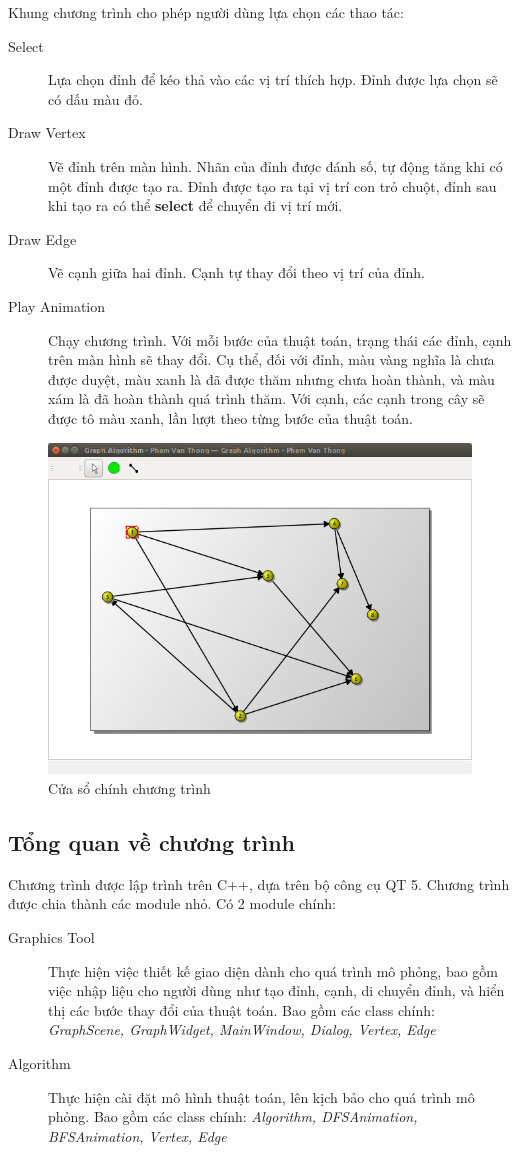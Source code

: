 \documentclass[a4paper,10pt]{article}
\begin{document}
Khung chương trình cho phép người dùng lựa chọn các thao tác:
\begin{description}
\item[Select] Lựa chọn đỉnh để kéo thả vào các vị trí thích hợp. Đỉnh được lựa chọn sẽ có dấu màu đỏ.
\item[Draw Vertex] Vẽ đỉnh trên màn hình. Nhãn của đỉnh được đánh số, tự động tăng khi có một đỉnh được tạo ra. Đỉnh được tạo ra tại vị trí con trỏ chuột, đỉnh sau khi tạo ra có thể \textbf{select} để chuyển đi vị trí mới.
\item[Draw Edge] Vẽ cạnh giữa hai đỉnh. Cạnh tự thay đổi theo vị trí của đỉnh.
\item[Play Animation] Chạy chương trình. Với mỗi bước của thuật toán, trạng thái các đỉnh, cạnh trên màn hình sẽ thay đổi. Cụ thể, đối với đỉnh, màu vàng nghĩa là chưa được duyệt, màu xanh là đã được thăm nhưng chưa hoàn thành, và màu xám là đã hoàn thành quá trình thăm. Với cạnh, các cạnh trong cây sẽ được tô màu xanh, lần lượt theo từng bước của thuật toán.
\end{description}
\begin{figure}[h!]
  \centering
  \includegraphics[scale=0.5]{images/pic5.png}
  \caption{Cửa sổ chính chương trình }
\end{figure}

\subsection{Tổng quan về chương trình}
Chương trình được lập trình trên C++, dựa trên bộ công cụ QT 5. Chương trình được chia thành các module nhỏ. Có 2 module chính:
\begin{description}
\item[Graphics Tool ] Thực hiện việc thiết kế giao diện dành cho quá trình mô phỏng, bao gồm việc nhập liệu cho người dùng như tạo đỉnh, cạnh, di chuyển đỉnh, và hiển thị các bước thay đổi của thuật toán. Bao gồm các class chính: \emph{GraphScene, GraphWidget, MainWindow, Dialog, Vertex, Edge}
\item[Algorithm] Thực hiện cài đặt mô hình thuật toán, lên kịch bảo cho quá trình mô phỏng. Bao gồm các class chính: \emph{Algorithm, DFSAnimation, BFSAnimation, Vertex, Edge}
\end{description}
\end{document}
